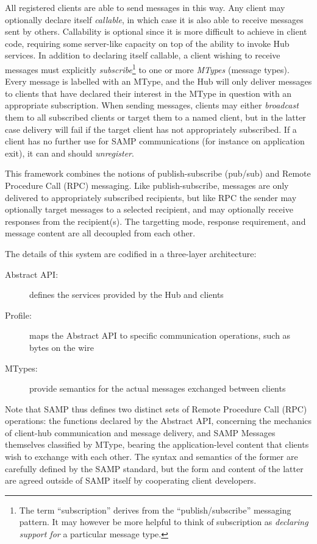 \documentclass[5p]{elsarticle}
\begin{document}
All registered clients are able to send messages in this way.
Any client may optionally declare itself {\em callable\/},
in which case it is also able to receive messages sent by others.
Callability is optional since it is more difficult to
achieve in client code, requiring some server-like capacity
on top of the ability to invoke Hub services.
In addition to declaring itself callable, a client wishing to
receive messages must explicitly {\em subscribe}\footnote{
   The term ``subscription'' derives from the ``publish/subscribe''
   messaging pattern.  It may however be more helpful to think of
   subscription as {\em declaring support for\/} a particular message type.
}
to one or more {\em MTypes} (message types).
Every message is labelled with an MType,
and the Hub will only deliver messages to clients
that have declared their interest in the MType in question with
an appropriate subscription.  When sending messages, clients may
either {\em broadcast\/} them to all subscribed clients or
target them to a named client, but in the latter case delivery
will fail if the target client has not appropriately subscribed.
If a client has no further use for SAMP communications
(for instance on application exit), it can and should {\em unregister\/}.

This framework combines the notions of publish-subscribe
(pub/sub) and Remote Procedure Call (RPC) messaging.
Like publish-subscribe, messages are only delivered to
appropriately subscribed recipients,
but like RPC the sender may optionally
target messages to a selected recipient,
and may optionally receive responses from the recipient(s).
The targetting mode, response requirement, and message content
are all decoupled from each other.

The details of this system are codified in a three-layer architecture:
\begin{description}
\item[Abstract API:] defines the services provided by the Hub and clients
\item[Profile:] maps the Abstract API to specific communication operations,
  such as bytes on the wire
\item[MTypes:] provide semantics for the actual messages exchanged between
  clients
\end{description}

Note that SAMP thus defines two distinct sets of
Remote Procedure Call (RPC) operations:
the functions declared by the Abstract API,
concerning the mechanics of client-hub communication and message delivery,
and SAMP Messages themselves classified by MType,
bearing the application-level content that clients wish
to exchange with each other.
The syntax and semantics of the former are carefully defined by the
SAMP standard, but the form and content of the latter are
agreed outside of SAMP itself by cooperating client developers.
\end{document}
